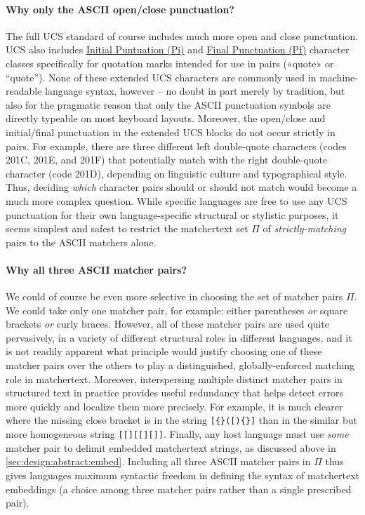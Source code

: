 \paragraph{Why only the ASCII open/close punctuation?}
The full UCS standard of course includes
much more open and close punctuation.
UCS also includes
\href{https://www.compart.com/en/unicode/category/Pi}{Initial Puntuation (Pi)}
and 
\href{https://www.compart.com/en/unicode/category/Pf}{Final Punctuation (Pf)}
character classes specifically for quotation marks
intended for use in pairs
(\eg «quote» or “quote”).
None of these extended UCS characters are commonly used
in machine-readable language syntax, however --
no doubt in part merely by tradition,
but also for the pragmatic reason that only the ASCII punctuation symbols
are directly typeable on most keyboard layouts.
Moreover, the open/close and initial/final punctuation
in the extended UCS blocks
do not occur strictly in pairs.
For example,
there are three different left double-quote characters
(codes 201C, 201E, and 201F)
that potentially match with the right double-quote character (code 201D),
depending on linguistic culture and typographical style.
Thus, deciding \emph{which} character pairs should or should not match
would become a much more complex question.
While specific languages are free to use any UCS punctuation
for their own language-specific structural or stylistic purposes,
it seems simplest and safest to restrict the matchertext set $\Pi$ of
\emph{strictly-matching} pairs to the ASCII matchers alone.

\paragraph{Why all three ASCII matcher pairs?}

We could of course be even more selective
in choosing the set of matcher pairs $\Pi$.
We could take only one matcher pair, for example:
either parentheses \emph{or} square brackets \emph{or} curly braces.
However, all of these matcher pairs are used quite pervasively,
in a variety of different structural roles in different languages,
and it is not readily apparent what principle would justify
choosing one of these matcher pairs over the others
to play a distinguished, globally-enforced matching role in matchertext.
Moreover, interspersing multiple distinct matcher pairs in structured text
in practice provides useful redundancy
that helps detect errors more quickly and localize them more precisely.
For example, it is much clearer where the missing close bracket is
in the string \verb|[{}([){}]|
than in the similar but more homogeneous string \verb|[[][[][]]|.
Finally,
any host language must use \emph{some} matcher pair
to delimit embedded matchertext strings,
as discussed above in \cref{sec:design:abstract:embed}.
Including all three ASCII matcher pairs in $\Pi$
thus gives languages maximum syntactic freedom
in defining the syntax of matchertext embeddings
(\ie a choice among three matcher pairs rather than a single prescribed pair).


